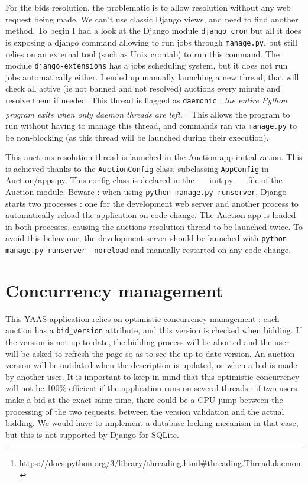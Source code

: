 \documentclass[a4paper, 11pt]{report}
\begin{document}
    For the bids resolution, the problematic is to allow resolution without any web request being made. We can't use classic Django views, and need to find another method. To begin I had a look at the Django module \texttt{django\_cron} but all it does is exposing a django command allowing to run jobs through \texttt{manage.py}, but still relies on an external tool (such as Unix crontab) to run this command. The module \texttt{django-extensions} has a jobs scheduling system, but it does not run jobs automatically either. I ended up manually launching a new thread, that will check all active (ie not banned and not resolved) auctions every minute and resolve them if needed. This thread is flagged as \texttt{daemonic} : \textit{the entire Python program exits when only daemon threads are left. }\footnote{https://docs.python.org/3/library/threading.html\#threading.Thread.daemon} This allows the program to run without having to manage this thread, and commands ran via \texttt{manage.py} to be non-blocking (as this thread will be launched during their execution). 

    This auctions resolution thread is launched in the Auction app initialization. This is achieved thanks to the \texttt{AuctionConfig} class, subclassing \texttt{AppConfig} in Auction/apps.py. This config class is declared in the \_\_init.py\_\_ file of the Auction module. Beware : when using \texttt{python manage.py runserver}, Django starts two processes : one for the development web server and another process to automatically reload the application on code change. The Auction app is loaded in both processes, causing the auctions resolution thread to be launched twice. To avoid this behaviour, the development server should be launched with \texttt{python manage.py runserver --noreload} and manually restarted on any code change. 

    \section{Concurrency management}

    This YAAS application relies on optimistic concurrency management : each auction has a \texttt{bid\_version} attribute, and this version is checked when bidding. If the version is not up-to-date, the bidding process will be aborted and the user will be asked to refresh the page so as to see the up-to-date version. An auction version will be outdated when the description is updated, or when a bid is made by another user. It is important to keep in mind that this optimistic concurrency will not be 100\% efficient if the application runs on several threads : if two users make a bid at the exact same time, there could be a CPU jump between the processing of the two requests, between the version validation and the actual bidding. We would have to implement a database locking mecanism in that case, but this is not supported by Django for SQLite. 
\end{document}
